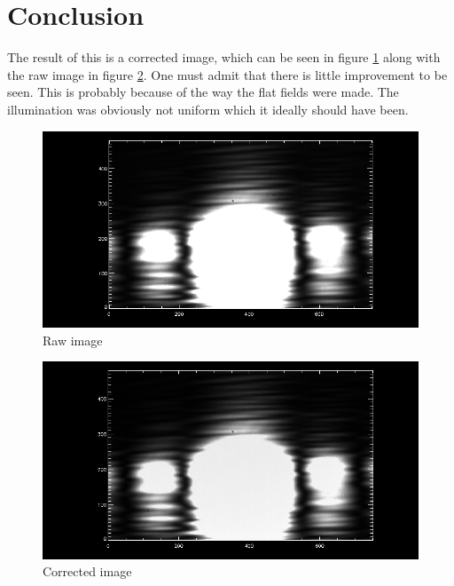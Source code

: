 \documentclass[a4paper,12pt]{article}
\begin{document}
\section{Conclusion}
The result of this is a corrected image, which can be seen in figure \ref{fig:Raw image} along with the raw image in figure \ref{fig:Corrected}. One must admit that there is little improvement to be seen. This is probably because of the way the flat fields were made. The illumination was obviously not uniform which it ideally should have been.
\begin{figure}[H]
\centering
\includegraphics[width=\textwidth]{Raw_image}
\caption{Raw image}\label{fig:Raw image}
\end{figure}
\begin{figure}[H]
\centering
\includegraphics[width=\textwidth]{Corrected}
\caption{Corrected image}\label{fig:Corrected}
\end{figure}
\end{document}
